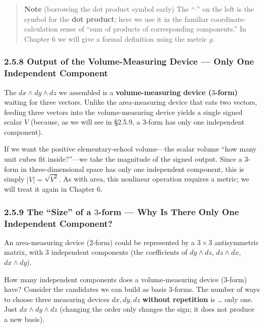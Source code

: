 \begin{quote}
\textbf{Note} (borrowing the dot product symbol early) The ``\(\cdot\)''
on the left is the symbol for the \textbf{dot product}; here we use it
in the familiar coordinate-calculation sense of ``sum of products of
corresponding components.'' In Chapter 6 we will give a formal
definition using the metric \(g\).
\end{quote}

\hypertarget{output-of-the-volume-measuring-device-only-one-independent-component}{%
\subsubsection{2.5.8 Output of the Volume-Measuring Device --- Only One
Independent
Component}\label{output-of-the-volume-measuring-device-only-one-independent-component}}

The \(dx \wedge dy \wedge dz\) we assembled is a
\textbf{volume-measuring device (\(3\)-form)} waiting for three vectors.
Unlike the area-measuring device that eats two vectors, feeding three
vectors into the volume-measuring device yields a single signed scalar
\(V\) (because, as we will see in §2.5.9, a \(3\)-form has only one
independent component).

If we want the positive elementary-school volume---the scalar volume
``how many unit cubes fit inside?''---we take the magnitude of the
signed output. Since a \(3\)-form in three-dimensional space has only
one independent component, this is simply \(|V|=\sqrt{V^2}\). As with
area, this nonlinear operation requires a metric; we will treat it again
in Chapter 6.

\hypertarget{the-size-of-a-3-form-why-is-there-only-one-independent-component}{%
\subsubsection{\texorpdfstring{2.5.9 The ``Size'' of a \(3\)-form ---
Why Is There Only One Independent
Component?}{2.5.9 The ``Size'' of a 3-form --- Why Is There Only One Independent Component?}}\label{the-size-of-a-3-form-why-is-there-only-one-independent-component}}

An area-measuring device (\(2\)-form) could be represented by a
\(3 \times 3\) antisymmetric matrix, with 3 independent components (the
coefficients of \(dy \wedge dz\), \(dz \wedge dx\), \(dx \wedge dy\)).

How many independent components does a volume-measuring device
(\(3\)-form) have? Consider the candidates we can build as basis
\(3\)-forms. The number of ways to choose three measuring devices
\(dx, dy, dz\) \textbf{without repetition} is \ldots{} only one. Just
\(dx \wedge dy \wedge dz\) (changing the order only changes the sign; it
does not produce a new basis).

